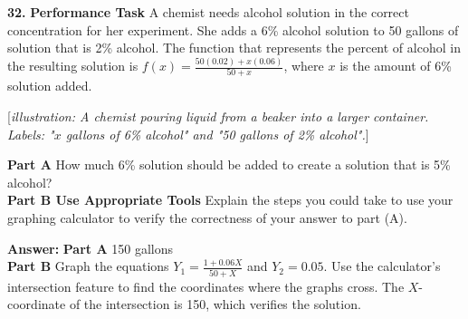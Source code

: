 \documentclass{article}
\newenvironment{practice}[2]{\textbf{#1.}}{\vspace{1em}}
\newcommand{\answer}[1]{\par\textbf{Answer:} #1}
\newcommand{\placeholder}[2]{[\textit{#1: #2}]}
\begin{document}
\begin{practice}{32}{DOK}
\textbf{Performance Task} A chemist needs alcohol solution in the correct concentration for her experiment. She adds a 6\% alcohol solution to 50 gallons of solution that is 2\% alcohol. The function that represents the percent of alcohol in the resulting solution is $f(x) = \frac{50(0.02) + x(0.06)}{50 + x}$, where $x$ is the amount of 6\% solution added.

\placeholder{illustration}{A chemist pouring liquid from a beaker into a larger container. Labels: "$x$ gallons of 6\% alcohol" and "50 gallons of 2\% alcohol".}

\textbf{Part A} How much 6\% solution should be added to create a solution that is 5\% alcohol? \\
\textbf{Part B Use Appropriate Tools} Explain the steps you could take to use your graphing calculator to verify the correctness of your answer to part (A).
\answer{
\textbf{Part A} 150 gallons \\
\textbf{Part B} Graph the equations $Y_1 = \frac{1 + 0.06X}{50 + X}$ and $Y_2 = 0.05$. Use the calculator's intersection feature to find the coordinates where the graphs cross. The $X$-coordinate of the intersection is 150, which verifies the solution.
}
\end{practice}
\end{document}

